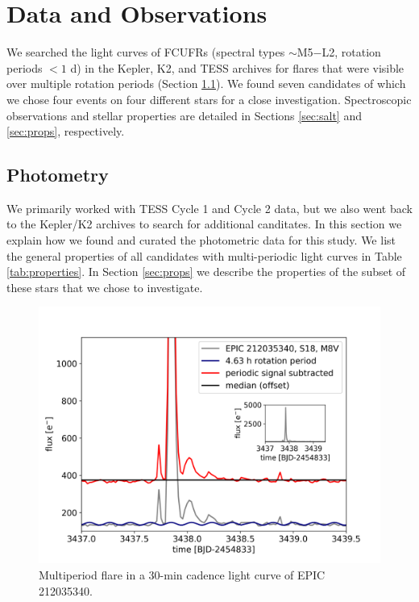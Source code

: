 \documentclass[fleqn,usenatbib,letters]{mnras}%
\newcommand{\FD}{EPIC 212035340} %
\begin{document}
\section{Data and Observations}
\label{sec:data}
We searched the light curves of FCUFRs (spectral types $\sim$M5$-$L2, rotation periods $< 1$ d) in the Kepler, K2, and TESS archives for flares that were visible over multiple rotation periods (Section \ref{sec:photometry}). We found seven candidates of which we chose four events on four different stars for a close investigation. Spectroscopic observations and stellar properties are detailed in Sections \ref{sec:salt} and \ref{sec:props}, respectively.

\subsection{Photometry}
\label{sec:photometry}
We primarily worked with TESS Cycle 1 and Cycle 2 data, but we also went back to the Kepler/K2 archives to search for additional canditates. In this section we explain how we found and curated the photometric data for this study. We list the general properties of all candidates with multi-periodic light curves in Table \ref{tab:properties}. In Section \ref{sec:props} we describe the properties of the subset of these stars that we chose to investigate.
\begin{figure}
	\includegraphics[width=\columnwidth]{figures/EPIC212035340_inset.png}
    \caption{Multiperiod flare in a 30-min cadence light curve of \FD.}
    \label{fig:\FD}
\end{figure}
\end{document}
